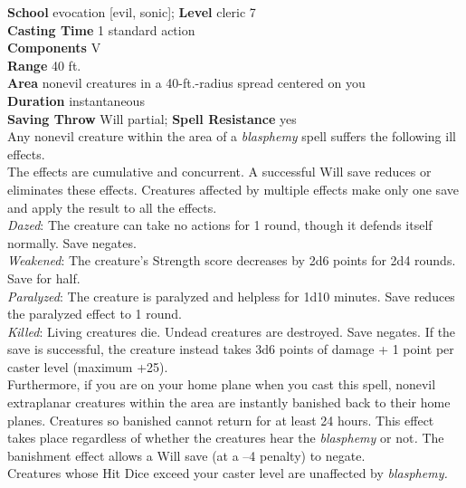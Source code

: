\textbf{School }evocation [evil, sonic]; \textbf{Level }cleric 7\\
\textbf{Casting Time} 1 standard action\\
\textbf{Components} V\\
\textbf{Range }40 ft.\\
\textbf{Area }nonevil creatures in a 40-ft.-radius spread centered on you\\
\textbf{Duration }instantaneous\\
\textbf{Saving Throw} Will partial; \textbf{Spell Resistance} yes\\
Any nonevil creature within the area of a \textit{blasphemy }spell suffers the following ill effects.\\
The effects are cumulative and concurrent. A successful Will save reduces or eliminates these effects. Creatures affected by multiple effects make only one save and apply the result to all the effects.\\
\textit{Dazed}: The creature can take no actions for 1 round, though it defends itself normally. Save negates.\\
\textit{Weakened}: The creature's Strength score decreases by 2d6 points for 2d4 rounds. Save for half.\\
\textit{Paralyzed}: The creature is paralyzed and helpless for 1d10 minutes. Save reduces the paralyzed effect to 1 round.\\
\textit{Killed}: Living creatures die. Undead creatures are destroyed. Save negates. If the save is successful, the creature instead takes 3d6 points of damage + 1 point per caster level (maximum +25).\\
Furthermore, if you are on your home plane when you cast this spell, nonevil extraplanar creatures within the area are instantly banished back to their home planes. Creatures so banished cannot return for at least 24 hours. This effect takes place regardless of whether the creatures hear the \textit{blasphemy} or not\textit{. }The banishment effect allows a Will save (at a –4 penalty) to negate.\\
Creatures whose Hit Dice exceed your caster level are unaffected by \textit{blasphemy.}\\
